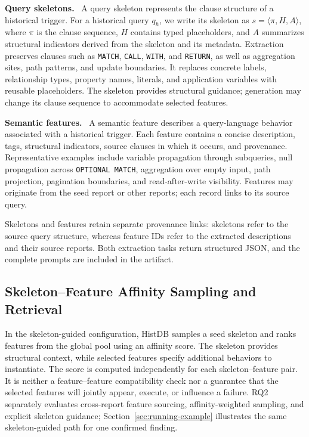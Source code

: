 \documentclass[acmsmall,screen,anonymous]{acmart}
\newcommand{\cnpara}[1]{\par\noindent\textbf{#1.}\ }
\begin{document}
\cnpara{Query skeletons}
A query skeleton represents the clause structure of a historical trigger. For a historical query $q_h$, we write its skeleton as $s=\langle\pi,H,A\rangle$, where $\pi$ is the clause sequence, $H$ contains typed placeholders, and $A$ summarizes structural indicators derived from the skeleton and its metadata. Extraction preserves clauses such as \lstinline|MATCH|, \lstinline|CALL|, \lstinline|WITH|, and \lstinline|RETURN|, as well as aggregation sites, path patterns, and update boundaries. It replaces concrete labels, relationship types, property names, literals, and application variables with reusable placeholders. The skeleton provides structural guidance; generation may change its clause sequence to accommodate selected features.

\cnpara{Semantic features}
A semantic feature describes a query-language behavior associated with a historical trigger. Each feature contains a concise description, tags, structural indicators, source clauses in which it occurs, and provenance. Representative examples include variable propagation through subqueries, null propagation across \lstinline|OPTIONAL MATCH|, aggregation over empty input, path projection, pagination boundaries, and read-after-write visibility. Features may originate from the seed report or other reports; each record links to its source query.

Skeletons and features retain separate provenance links: skeletons refer to the source query structure, whereas feature IDs refer to the extracted descriptions and their source reports. Both extraction tasks return structured JSON, and the complete prompts are included in the artifact.



\subsection{Skeleton--Feature Affinity Sampling and Retrieval}
\label{sec:feature-selection}

In the skeleton-guided configuration, HistDB samples a seed skeleton and ranks features from the global pool using an affinity score. The skeleton provides structural context, while selected features specify additional behaviors to instantiate. The score is computed independently for each skeleton--feature pair. It is neither a feature--feature compatibility check nor a guarantee that the selected features will jointly appear, execute, or influence a failure. RQ2 separately evaluates cross-report feature sourcing, affinity-weighted sampling, and explicit skeleton guidance; Section~\ref{sec:running-example} illustrates the same skeleton-guided path for one confirmed finding.
\end{document}
